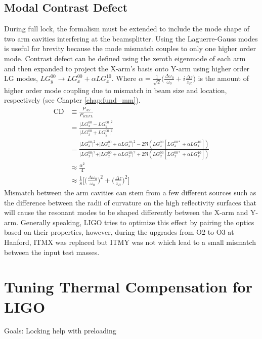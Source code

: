 	\subsection{Modal Contrast Defect}
	During full lock, the formalism must be extended to include the mode shape of two arm cavities interfering at the beamsplitter. Using the Laguerre-Gauss modes is useful for brevity because the mode mismatch couples to only one higher order mode. Contrast defect can be defined using the zeroth eigenmode of each arm and then expanded to project the X-arm's basis onto Y-arm using higher order LG modes, $LG^{00}_y \rightarrow  LG^{00}_x + \alpha LG^{10}_x$.  Where $\alpha = \frac{1}{\sqrt{2}} \big(\frac{\Delta \omega_{0}}{\omega_{0}} + i \frac{\Delta z }{z_R}\big)$ is the amount of higher order mode coupling due to mismatch in beam size and location, respectively (see Chapter \ref{chap:fund_mm}).
	\begin{equation}\label{CD_mode}
	\begin{aligned}
	\text{CD} 	&\equiv \frac{P_{AS}}{P_{REFL}} \\
	&= \frac{\vert LG^{00}_x - LG^{00}_y \vert^2}{\vert LG^{00}_x + LG^{00}_y \vert^2}\\
	&= \frac{\vert LG^{00}_x \vert^2 + \vert LG^{00}_x + \alpha LG^{10}_x \vert^2 - 2\Re(LG^{00}_x [LG^{00*}_x + \alpha LG^{10}_x ])}{\vert LG^{00}_x \vert^2 + \vert LG^{00}_x + \alpha LG^{10}_x \vert^2 + 2\Re(LG^{00}_x [LG^{00*}_x + \alpha LG^{10}_x ])}\\
	&\approx \frac{\alpha^2}{4}\\
	&\approx \frac{1}{8} \bigg[ \bigg(\frac{\Delta\omega_{0}}{\omega_{0}} \bigg)^2+  \bigg(\frac{ \Delta z }{z_R}\bigg)^2 \bigg]
	\end{aligned}
	\end{equation}
	Mismatch between the arm cavities can stem from a few different sources such as the difference between the radii of curvature on the high reflectivity surfaces that will cause the resonant modes to be shaped differently between the X-arm and Y-arm.  Generally speaking, LIGO tries to optimize this effect by pairing the optics based on their properties, however, during the upgrades from O2 to O3 at Hanford, ITMX was replaced but ITMY was not which lead to a small mismatch between the input test masses.
	
	\section{Tuning Thermal Compensation for LIGO}
	Goals: Locking help with preloading \cite{winkler_thermaldist} \cite{Strain_TL}
	
